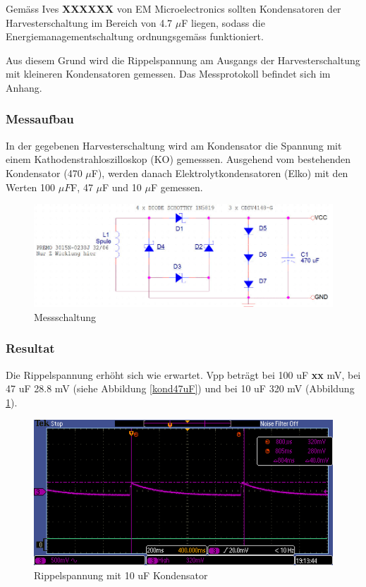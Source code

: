 Gemäss Ives \textbf{XXXXXX} von EM Microelectronics sollten Kondensatoren der Harvesterschaltung im Bereich von 4.7 $\mu$F liegen, sodass die Energiemanagementschaltung ordnungsgemäss funktioniert.  

Aus diesem Grund wird die Rippelspannung am Ausgangs der Harvesterschaltung mit kleineren Kondensatoren gemessen. Das Messprotokoll befindet sich im Anhang.

\subsubsection*{Messaufbau}
In der gegebenen Harvesterschaltung wird am Kondensator die Spannung mit einem Kathodenstrahloszilloskop (KO) gemesssen. Ausgehend vom bestehenden Kondensator (470 $ \mu $F), werden danach Elektrolytkondensatoren (Elko) mit den Werten 100 $\mu F $F, 47 $\mu$F und 10 $\mu$F gemessen.

\begin{figure}[h]
    \includegraphics[scale = 0.4]{3Vorgehen/imag/messschaltungHarvesterschaltung.jpg}
    \caption{Messschaltung}
\end{figure}

\subsubsection*{Resultat}

Die Rippelspannung erhöht sich wie erwartet. Vpp beträgt bei 100 uF \textbf{xx} mV, bei 47 uF 28.8 mV (siehe Abbildung \ref{kond47uF}) und bei 10 uF 320 mV (Abbildung \ref{kond10uF}).
 
\begin{figure}
    \includegraphics[scale = 0.4]{3Vorgehen/imag/10uF.PNG}
    \caption{Rippelspannung mit 10 uF Kondensator}\label{kond10uF} 
\end{figure}

